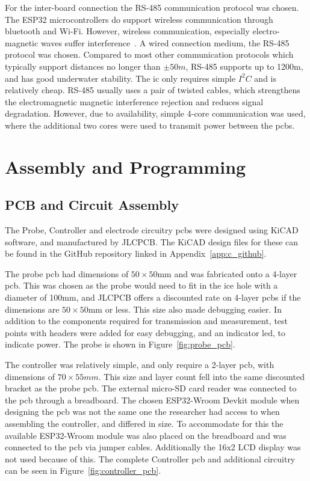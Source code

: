 For the inter-board connection the RS-485 communication protocol was chosen.
The ESP32 microcontrollers do support wireless communication through bluetooth and Wi-Fi.
However, wireless communication, especially electro-magnetic waves suffer interference~\cite{waves_in_water}.
A wired connection medium, the RS-485 protocol was chosen. 
Compared to most other communication protocols which typically support distances no longer than $\pm50m$, RS-485 supports up to 1200m, and has good underwater stability.
The \gls{ic} only requires simple $I^2C$ and is relatively cheap.
RS-485 usually uses a pair of twisted cables, which strengthens the electromagnetic magnetic interference rejection and reduces signal degradation.
However, due to availability, simple 4-core communication was used, where the additional two cores were used to transmit power between the \gls{pcb}s.

\section{Assembly and Programming}
\subsection{PCB and Circuit Assembly}
The Probe, Controller and electrode circuitry \gls{pcb}s were designed using KiCAD software, and manufactured by JLCPCB. The KiCAD design files for these can be found in the GitHub repository linked in Appendix~\ref{app:c_github}.

The probe \gls{pcb} had dimensions of $50\times50$mm and was fabricated onto a 4-layer \gls{pcb}.
This was chosen as the probe would need to fit in the ice hole with a diameter of 100mm, and JLCPCB offers a discounted rate on 4-layer \gls{pcb}s if the dimensions are $50\times50$mm or less. 
This size also made debugging easier.
In addition to the components required for transmission and measurement, test points with headers were added for easy debugging, and an indicator \gls{led}, to indicate power.
The probe is shown in Figure~\ref{fig:probe_pcb}.



The controller was relatively simple, and only require a 2-layer \gls{pcb}, with dimensions of $70\times55mm$.
This size and layer count fell into the same discounted bracket as the probe \gls{pcb}.
The external micro-SD card reader was connected to the \gls{pcb} through a breadboard.
The chosen ESP32-Wroom Devkit module when designing the \gls{pcb} was not the same one the researcher had access to when assembling the controller, and differed in size.
To accommodate for this the available ESP32-Wroom module was also placed on the breadboard and was connected to the \gls{pcb} via jumper cables.
Additionally the 16x2 LCD display was not used because of this.
The complete Controller \gls{pcb} and additional circuitry can be seen in Figure~\ref{fig:controller_pcb}.

